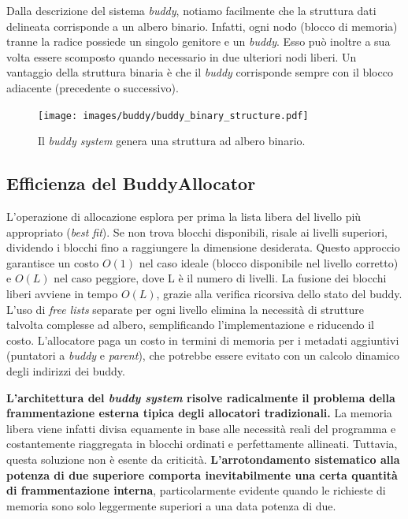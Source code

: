 Dalla descrizione del sistema \textit{buddy}, notiamo facilmente che la struttura dati delineata corrisponde a un albero binario. Infatti, ogni nodo (blocco di memoria) tranne la radice possiede un singolo genitore e un \textit{buddy}. Esso può inoltre a sua volta essere scomposto quando necessario in due ulteriori nodi liberi. Un vantaggio della struttura binaria è che il \textit{buddy} corrisponde sempre con il blocco adiacente (precedente o successivo).

\begin{figure}[H]
    \centering
    \texttt{[image: images/buddy/buddy\_binary\_structure.pdf]}
    \caption{Il \textit{buddy system} genera una struttura ad albero binario. }
    \label{fig:buddy_binary_structure}
\end{figure}


\subsection*{Efficienza del BuddyAllocator}
L'operazione di allocazione esplora per prima la lista libera del livello più appropriato (\textit{best fit}). Se non trova blocchi disponibili, risale ai livelli superiori, dividendo i blocchi fino a raggiungere la dimensione desiderata. Questo approccio garantisce un costo $O(1)$ nel caso ideale (blocco disponibile nel livello corretto) e $O(L)$ nel caso peggiore, dove L è il numero di livelli. La fusione dei blocchi liberi avviene in tempo $O(L)$, grazie alla verifica ricorsiva dello stato del buddy. 
L'uso di \textit{free lists} separate per ogni livello elimina la necessità di strutture talvolta complesse ad albero, semplificando l'implementazione e riducendo il costo. L'allocatore paga un costo in termini di memoria per i metadati aggiuntivi (puntatori a \textit{buddy} e \textit{parent}), che potrebbe essere evitato con un calcolo dinamico degli indirizzi dei buddy. 

\textbf{L’architettura del \textit{buddy system} risolve radicalmente il problema della frammentazione esterna tipica degli allocatori tradizionali.} La memoria libera viene infatti divisa equamente in base alle necessità reali del programma e costantemente riaggregata in blocchi ordinati e perfettamente allineati. Tuttavia, questa soluzione non è esente da criticità. \textbf{L'arrotondamento sistematico alla potenza di due superiore comporta inevitabilmente una certa quantità di frammentazione interna}, particolarmente evidente quando le richieste di memoria sono solo leggermente superiori a una data potenza di due.

